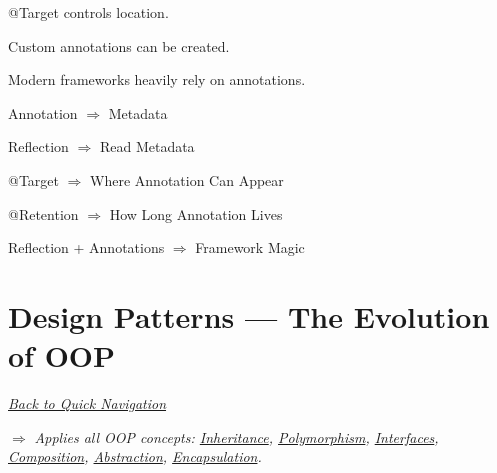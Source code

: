 \documentclass[11pt,a4paper]{book}
\begin{document}

\begin{rosettarule}
@Target controls location.

\end{rosettarule}


\begin{rosettarule}

Custom annotations can be created.

\end{rosettarule}


\begin{rosettarule}

Modern frameworks heavily rely
on annotations.

\end{rosettarule}


\begin{compressionbox}


    Annotation $\Rightarrow$ Metadata
\vspace{0.5em}


    Reflection $\Rightarrow$ Read Metadata
\vspace{0.5em}


    @Target $\Rightarrow$ Where Annotation Can Appear
\vspace{0.5em}


   @Retention $\Rightarrow$ How Long Annotation Lives
\vspace{0.5em}


Reflection + Annotations $\Rightarrow$ Framework Magic
\end{compressionbox}
\chapter{Design Patterns --- The Evolution of OOP}\label{chap:patterns}

\smallskip
\noindent
\hyperref[sec:quick_nav]{\emph{Back to Quick Navigation}}

\smallskip
\noindent
\textcolor{RosettaRoyalPurple}{$\Rightarrow$}
\emph{Applies all OOP concepts: \hyperref[chap:inheritance]{Inheritance}, \hyperref[chap:polymorphism]{Polymorphism}, \hyperref[chap:interfaces]{Interfaces}, \hyperref[chap:composition]{Composition}, \hyperref[chap:abstraction]{Abstraction}, \hyperref[chap:encapsulation]{Encapsulation}.}
\end{document}
